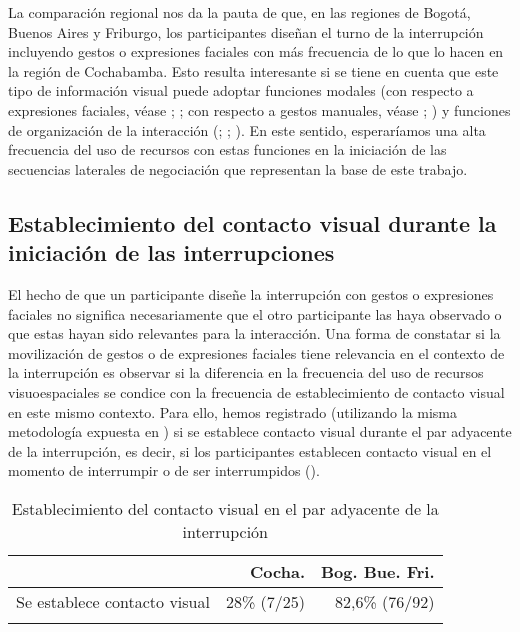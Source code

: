 \documentclass[output=paper]{../langscibook}
\begin{document}
La comparación regional nos da la pauta de que, en las regiones de Bogotá, Buenos Aires y Friburgo, los participantes diseñan el turno de la interrupción incluyendo gestos o expresiones faciales con más frecuencia de lo que lo hacen en la región de Cochabamba. Esto resulta interesante si se tiene en cuenta que este tipo de información visual puede adoptar funciones modales (con respecto a expresiones faciales, véase  \citealt{KaukomaaEtAl2014}; \citealt{RoseanoEtAl2015}; con respecto a gestos manuales, véase \citealt{Kendon2004}; \citealt{BressemMüller2014}) y funciones de organización de la interacción (\citealt{Goodwin1986}; \citealt{Mondada2016}; \citealt{DankelSatti2019}). En este sentido, esperaríamos una alta frecuencia del uso de recursos con estas funciones en la iniciación de las secuencias laterales de negociación que representan la base de este trabajo.

\subsection{Establecimiento del contacto visual durante la iniciación de las interrupciones}\label{sec:satti:3.3}

El hecho de que un participante diseñe la interrupción con gestos o expresiones faciales no significa necesariamente que el otro participante las haya observado o que estas hayan sido relevantes para la interacción. Una forma de constatar si la movilización de gestos o de expresiones faciales tiene relevancia en el contexto de la interrupción es observar si la diferencia en la frecuencia del uso de recursos visuoespaciales se condice con la frecuencia de establecimiento de contacto visual en este mismo contexto. Para ello, hemos registrado (utilizando la misma metodología expuesta en ) si se establece contacto visual durante el par adyacente de la interrupción, es decir, si los participantes establecen contacto visual en el momento de interrumpir o de ser interrumpidos ().

\begin{table}
\begin{tabularx}{\textwidth}{Xrr}
\lsptoprule
& {  Cocha.}  & {  Bog. Bue. Fri.} \\
\midrule
Se establece contacto visual & 28\% (7/25) & 82,6\% (76/92)\\
\lspbottomrule
\end{tabularx}
\caption{\label{tab:satti:3b} Establecimiento del contacto visual en el par adyacente de la interrupción}
\end{table}
\end{document}
